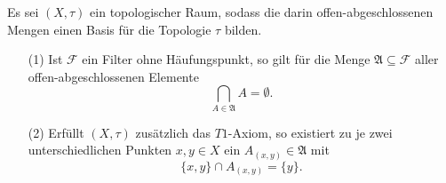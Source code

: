 \begin{lem}
  \label{lem:filterclusterpoint}
  Es sei $(X,\tau)$ ein topologischer Raum, sodass die darin offen-abgeschlossenen Mengen einen Basis für die Topologie $\tau$ bilden.
  \begin{itemize}
    \item[(1)] Ist $\mathcal{F}$ ein Filter ohne Häufungspunkt, so gilt für die Menge $\mathfrak{A} \subseteq \mathcal{F}$ aller offen-abgeschlossenen Elemente 
     \begin{displaymath}
       \bigcap_{A \in \mathfrak{A}} A = \emptyset.
     \end{displaymath}
   \item[(2)] Erfüllt $(X,\tau)$ zusätzlich das $T1$-Axiom, so existiert zu je zwei unterschiedlichen Punkten $x,y \in X$ ein $A_{(x,y)} \in \mathfrak{A}$ mit 
     \begin{displaymath}
       \{x,y\} \cap A_{(x,y)} = \{y\}.
     \end{displaymath}
  \end{itemize}
\end{lem}

